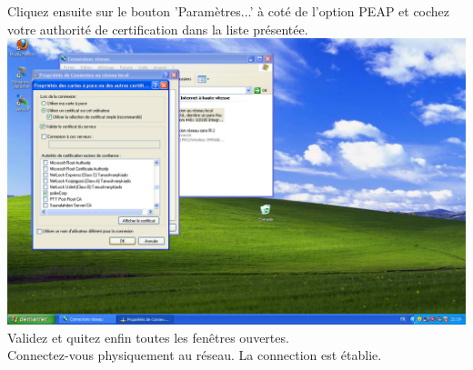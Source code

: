 Cliquez ensuite sur le bouton 'Paramètres...' à coté de l'option PEAP et cochez votre authorité de certification dans la liste présentée.\\
\includegraphics[width=\screenShotSize{}]{imgUser/tlsParams.PNG}\\
Validez et quitez enfin toutes les fenêtres ouvertes.\\
Connectez-vous physiquement au réseau. La connection est établie.






